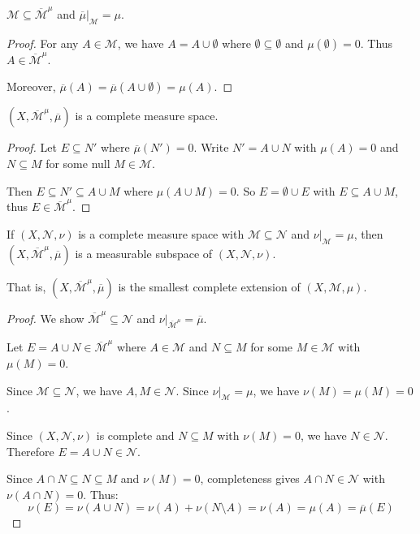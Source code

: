 \bigskip

\begin{proposition}
    $\mathcal{M} \subseteq \overline{\mathcal{M}}^\mu$ and $\overline{\mu}|_{\mathcal{M}} = \mu$.
\end{proposition}

\begin{proof}
    For any $A \in \mathcal{M}$, we have $A = A \cup \emptyset$ where $\emptyset \subseteq \emptyset$ 
    and $\mu(\emptyset) = 0$. Thus $A \in \overline{\mathcal{M}}^\mu$.
    
    Moreover, $\overline{\mu}(A) = \overline{\mu}(A \cup \emptyset) = \mu(A)$.
\end{proof}

\begin{proposition}
    $(X, \overline{\mathcal{M}}^\mu, \overline{\mu})$ is a complete measure space.
\end{proposition}

\begin{proof}
    Let $E \subseteq N'$ where $\overline{\mu}(N') = 0$. Write $N' = A \cup N$ with $\mu(A) = 0$ 
    and $N \subseteq M$ for some null $M \in \mathcal{M}$.
    
    Then $E \subseteq N' \subseteq A \cup M$ where $\mu(A \cup M) = 0$. 
    So $E = \emptyset \cup E$ with $E \subseteq A \cup M$, thus $E \in \overline{\mathcal{M}}^\mu$.
\end{proof}

\bigskip
\begin{theorem}
    If $(X, \mathcal{N}, \nu)$ is a complete measure space with $\mathcal{M} \subseteq \mathcal{N}$ 
    and $\nu|_{\mathcal{M}} = \mu$, then $(X, \overline{\mathcal{M}}^\mu, \overline{\mu})$ is a 
    measurable subspace of $(X, \mathcal{N}, \nu)$.
    
    That is, $(X, \overline{\mathcal{M}}^\mu, \overline{\mu})$ is the smallest complete extension of 
    $(X, \mathcal{M}, \mu)$.
\end{theorem}

\begin{proof}
    We show $\overline{\mathcal{M}}^\mu \subseteq \mathcal{N}$ and $\nu|_{\overline{\mathcal{M}}^\mu} = \overline{\mu}$.
    
    Let $E = A \cup N \in \overline{\mathcal{M}}^\mu$ where $A \in \mathcal{M}$ and $N \subseteq M$ 
    for some $M \in \mathcal{M}$ with $\mu(M) = 0$.
    
    Since $\mathcal{M} \subseteq \mathcal{N}$, we have $A, M \in \mathcal{N}$. 
    Since $\nu|_{\mathcal{M}} = \mu$, we have $\nu(M) = \mu(M) = 0$.
    
    Since $(X, \mathcal{N}, \nu)$ is complete and $N \subseteq M$ with $\nu(M) = 0$, 
    we have $N \in \mathcal{N}$. Therefore $E = A \cup N \in \mathcal{N}$.
    
    Since $A \cap N \subseteq N \subseteq M$ and $\nu(M) = 0$, completeness gives $A \cap N \in \mathcal{N}$ 
    with $\nu(A \cap N) = 0$. Thus:
    \[
        \nu(E) = \nu(A \cup N) = \nu(A) + \nu(N \setminus A) = \nu(A) = \mu(A) = \overline{\mu}(E)
    \]
\end{proof}


